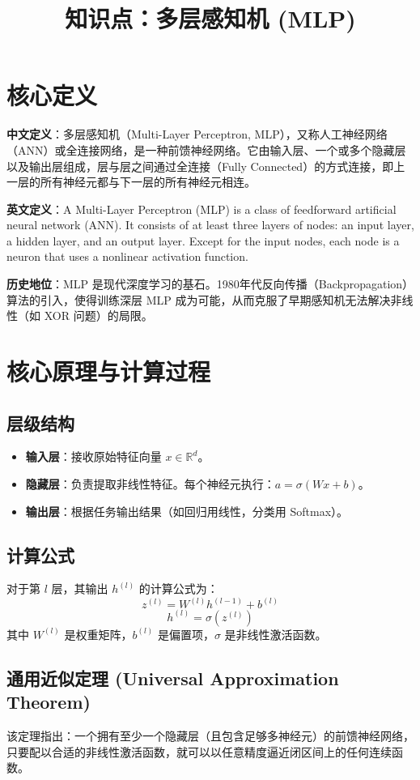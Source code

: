\documentclass[12pt, a4paper]{article}
\title{知识点：多层感知机 (MLP)}
\author{}
\date{}
\begin{document}
\maketitle

\section{核心定义}
\textbf{中文定义}：多层感知机（Multi-Layer Perceptron, MLP），又称人工神经网络（ANN）或全连接网络，是一种前馈神经网络。它由输入层、一个或多个隐藏层以及输出层组成，层与层之间通过全连接（Fully Connected）的方式连接，即上一层的所有神经元都与下一层的所有神经元相连。

\textbf{英文定义}：A Multi-Layer Perceptron (MLP) is a class of feedforward artificial neural network (ANN). It consists of at least three layers of nodes: an input layer, a hidden layer, and an output layer. Except for the input nodes, each node is a neuron that uses a nonlinear activation function.

\textbf{历史地位}：MLP 是现代深度学习的基石。1980年代反向传播（Backpropagation）算法的引入，使得训练深层 MLP 成为可能，从而克服了早期感知机无法解决非线性（如 XOR 问题）的局限。

\section{核心原理与计算过程}

\subsection{层级结构}
\begin{itemize}
    \item \textbf{输入层}：接收原始特征向量 $x \in \mathbb{R}^d$。
    \item \textbf{隐藏层}：负责提取非线性特征。每个神经元执行：$a = \sigma(Wx + b)$。
    \item \textbf{输出层}：根据任务输出结果（如回归用线性，分类用 Softmax）。
\end{itemize}

\subsection{计算公式}
对于第 $l$ 层，其输出 $h^{(l)}$ 的计算公式为：
$$ z^{(l)} = W^{(l)} h^{(l-1)} + b^{(l)} $$
$$ h^{(l)} = \sigma(z^{(l)}) $$
其中 $W^{(l)}$ 是权重矩阵，$b^{(l)}$ 是偏置项，$\sigma$ 是非线性激活函数。

\subsection{通用近似定理 (Universal Approximation Theorem)}
该定理指出：一个拥有至少一个隐藏层（且包含足够多神经元）的前馈神经网络，只要配以合适的非线性激活函数，就可以以任意精度逼近闭区间上的任何连续函数。
\end{document}
